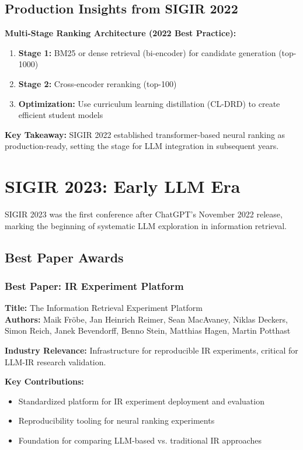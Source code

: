 \documentclass[11pt,letterpaper]{article}
\begin{document}
\subsection{Production Insights from SIGIR 2022}

\textbf{Multi-Stage Ranking Architecture (2022 Best Practice):}
\begin{enumerate}[leftmargin=*]
    \item \textbf{Stage 1:} BM25 or dense retrieval (bi-encoder) for candidate generation (top-1000)
    \item \textbf{Stage 2:} Cross-encoder reranking (top-100)
    \item \textbf{Optimization:} Use curriculum learning distillation (CL-DRD) to create efficient student models
\end{enumerate}

\textbf{Key Takeaway:} SIGIR 2022 established transformer-based neural ranking as production-ready, setting the stage for LLM integration in subsequent years.

\newpage

\section{\textcolor{year2023}{SIGIR 2023: Early LLM Era}}

SIGIR 2023 was the first conference after ChatGPT's November 2022 release, marking the beginning of systematic LLM exploration in information retrieval.

\subsection{Best Paper Awards}

\subsubsection{Best Paper: IR Experiment Platform}
\textbf{Title:} The Information Retrieval Experiment Platform\\
\textbf{Authors:} Maik Fröbe, Jan Heinrich Reimer, Sean MacAvaney, Niklas Deckers, Simon Reich, Janek Bevendorff, Benno Stein, Matthias Hagen, Martin Potthast

\textbf{Industry Relevance:} Infrastructure for reproducible IR experiments, critical for LLM-IR research validation.

\textbf{Key Contributions:}
\begin{itemize}[leftmargin=*]
    \item Standardized platform for IR experiment deployment and evaluation
    \item Reproducibility tooling for neural ranking experiments
    \item Foundation for comparing LLM-based vs. traditional IR approaches
\end{itemize}
\end{document}
